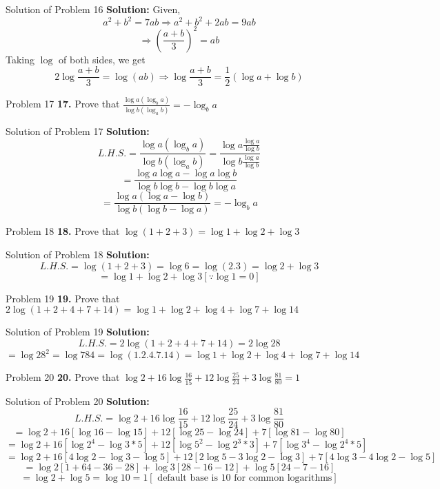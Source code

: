 \documentclass[aspectratio=1610,8pt]{beamer}
\begin{document}
\begin{frame}{Solution of Problem 16}
  \textbf{Solution:} Given, $$a^2 + b^2 = 7ab \Rightarrow a^2 + b^2 + 2ab = 9ab$$
  $$\Rightarrow \left(\frac{a + b}{3}\right)^2 = ab$$
  Taking $\log$ of both sides, we get
  $$2\log\frac{a + b}{3} = \log(ab) \Rightarrow \log\frac{a + b}{3} = \frac{1}{2}(\log a + \log b)$$
\end{frame}
\begin{frame}{Problem 17}
  \textbf{17.} Prove that $\frac{\log a(\log_ba)}{\log b(\log_ab)} = -\log_ba$
\end{frame}
\begin{frame}{Solution of Problem 17}
  \textbf{Solution:} $$L.H.S. = \frac{\log a(\log_ba)}{\log b(\log_ab)} = \frac{\log a\frac{\log a}{\log b}}{\log b\frac{\log
      a}{\log b}}$$
  $$= \frac{\log a\log a - \log a\log b}{\log b\log b - \log b\log a}$$
  $$= \frac{\log a(\log a - \log b)}{\log b(\log b - \log a)} = -\log_ba$$
\end{frame}
\begin{frame}{Problem 18}
  \textbf{18.} Prove that $\log(1 + 2 + 3) = \log 1 + \log 2 + \log 3$
\end{frame}
\begin{frame}{Solution of Problem 18}
  \textbf{Solution:} $$L.H.S. = \log(1 + 2 + 3) = \log 6 = \log (2.3) = \log 2 + \log 3$$
  $$= \log 1 + \log 2 + \log 3[\because \log 1 = 0]$$
\end{frame}
\begin{frame}{Problem 19}
  \textbf{19.} Prove that $2\log(1 + 2 + 4 + 7 + 14) = \log 1 + \log 2 + \log 4 + \log 7 + \log 14$
\end{frame}
\begin{frame}{Solution of Problem 19}
  \textbf{Solution:} $$L.H.S. = 2\log(1 + 2 + 4 + 7 + 14) = 2\log 28$$
  $$= \log 28^2 = \log 784 = \log(1.2.4.7.14) = \log 1 + \log 2 + \log 4 + \log 7 + \log 14$$
\end{frame}
\begin{frame}{Problem 20}
  \textbf{20.} Prove that $\log 2 + 16\log\frac{16}{15} + 12\log\frac{25}{24} + 3\log\frac{81}{80} = 1$
\end{frame}
\begin{frame}{Solution of Problem 20}
  \textbf{Solution:} $$L.H.S. = \log 2 + 16\log\frac{16}{15} + 12\log\frac{25}{24} + 3\log\frac{81}{80}$$
  $$= \log2 +16[\log16 - \log15] + 12[\log25 - \log24] + 7[\log81 - \log80]$$
  $$=\log2 + 16[\log2^4 - \log3*5] + 12[\log5^2 - \log2^3*3] + 7[\log3^4 - \log2^4*5]$$
  $$=\log2 + 16[4\log2 -\log3 -\log5]+12[2\log5 - 3\log2 -\log3] + 7[4\log3 - 4\log2 - \log 5]$$
  $$= \log2[1 + 64 - 36 - 28] + \log 3[28 - 16 - 12] + \log5[24 - 7 - 16]$$
  $$=\log 2 + \log5 = \log 10 = 1[\text{~default base is~} 10 \text{~for common logarithms}]$$
\end{frame}
\end{document}
